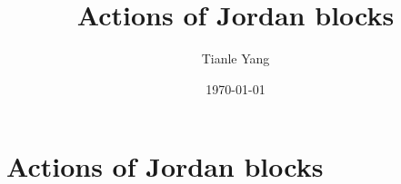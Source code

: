 \documentclass[sectionlevel=section,status=draft]{noteformyself}
\title{Actions of Jordan blocks}
\author{Tianle Yang}
\date{\today}
\begin{document}
    \maketitle

    \section[
      status=draft,
      tag=00000,
      label=\labelNFM{sec:actions-on-cohomology:actions-of-jordan-blocks}
    ]{Actions of Jordan blocks}


\end{document}
